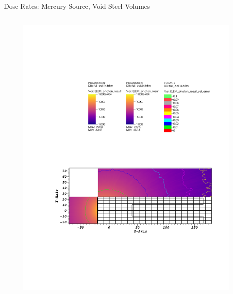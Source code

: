 \documentclass{beamer}
\begin{document}
\begin{frame}{Dose Rates: Mercury Source, Void Steel Volumes}
\begin{columns}[T]
        \begin{figure}
                \includegraphics[scale=0.49,trim={6.75cm 16.5cm 11cm 6cm},clip]{figs/dose_mer_cell_void.pdf}
        \end{figure}
\end{columns}

\begin{columns}[T]


\end{columns}
\end{frame}
\end{document}
